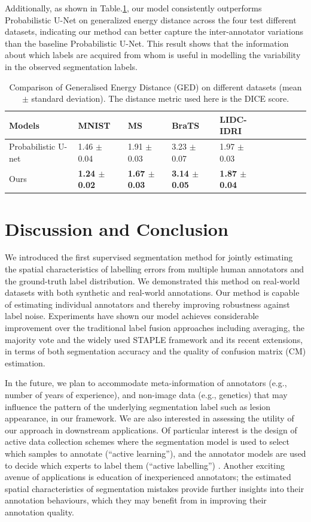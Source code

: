 Additionally, as shown in Table.\ref{ged_result}, our model consistently outperforms Probabilistic U-Net on generalized energy distance across the four test different datasets, indicating our method can better capture the inter-annotator variations than the baseline Probabilistic U-Net. This result shows that the information about which labels are acquired from whom is useful in modelling the variability in the observed segmentation labels. 

\begin{table}[t!]
	\center
	\footnotesize
	\begin{tabular}{@{}llllllllll}
		\hline
		 Models & MNIST & MS  & BraTS  & LIDC-IDRI  \\
		\hline	
		Probabilistic U-net \cite{kohl2018probabilistic}  & 1.46 $\pm$ 0.04 & 1.91 $\pm$ 0.03  & 3.23 $\pm$ 0.07  &  1.97 $\pm$ 0.03  \\
		Ours & \textbf{1.24 $\pm$ 0.02} & \textbf{1.67 $\pm$ 0.03}  & \textbf{3.14 $\pm$ 0.05}  &  \textbf{1.87 $\pm$ 0.04}  \\
		\hline
	\end{tabular}%
\caption{\footnotesize Comparison of Generalised Energy Distance (GED) on different datasets (mean $\pm$ standard deviation). The distance metric used here is the DICE score.}
\label{ged_result}
\end{table}



\section{Discussion and Conclusion}
We introduced the first supervised segmentation method for jointly estimating the spatial characteristics of labelling errors from multiple human annotators and the ground-truth label distribution. We demonstrated this method on real-world datasets with both synthetic and real-world annotations. Our method is capable of estimating individual annotators and thereby improving robustness against label noise. Experiments have shown our model achieves considerable improvement over the traditional label fusion approaches including averaging, the majority vote and the widely used STAPLE framework and its recent extensions, in terms of both segmentation accuracy and the quality of confusion matrix (CM) estimation.

In the future, we plan to accommodate meta-information of annotators (e.g., number of years of experience), and non-image data (e.g., genetics) that may influence the pattern of the underlying segmentation label such as lesion appearance, in our framework. We are also interested in assessing the utility of our approach in downstream applications. Of particular interest is the design of active data collection schemes where the segmentation model is used to select which samples to annotate (``active learning''), and the annotator models are used to decide which experts to label them (``active labelling'') \cite{yan2010modeling}. Another exciting avenue of applications is education of inexperienced annotators; the estimated spatial characteristics of segmentation mistakes provide further insights into their annotation behaviours, which they may benefit from in improving their annotation quality. 

